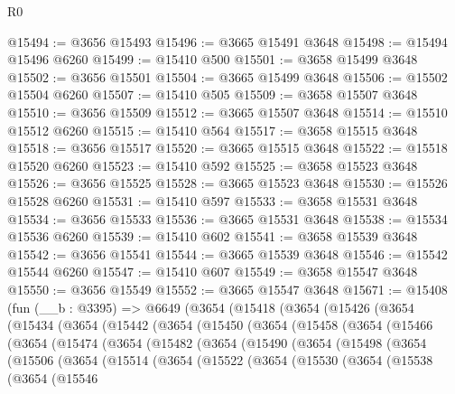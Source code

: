 \begin{lexlean}{R0}
\begin{coremodule}
@15494 := @3656 @15493
@15496 := @3665 @15491 @3648
@15498 := @15494 @15496 @6260
@15499 := @15410 @500
@15501 := @3658 @15499 @3648
@15502 := @3656 @15501
@15504 := @3665 @15499 @3648
@15506 := @15502 @15504 @6260
@15507 := @15410 @505
@15509 := @3658 @15507 @3648
@15510 := @3656 @15509
@15512 := @3665 @15507 @3648
@15514 := @15510 @15512 @6260
@15515 := @15410 @564
@15517 := @3658 @15515 @3648
@15518 := @3656 @15517
@15520 := @3665 @15515 @3648
@15522 := @15518 @15520 @6260
@15523 := @15410 @592
@15525 := @3658 @15523 @3648
@15526 := @3656 @15525
@15528 := @3665 @15523 @3648
@15530 := @15526 @15528 @6260
@15531 := @15410 @597
@15533 := @3658 @15531 @3648
@15534 := @3656 @15533
@15536 := @3665 @15531 @3648
@15538 := @15534 @15536 @6260
@15539 := @15410 @602
@15541 := @3658 @15539 @3648
@15542 := @3656 @15541
@15544 := @3665 @15539 @3648
@15546 := @15542 @15544 @6260
@15547 := @15410 @607
@15549 := @3658 @15547 @3648
@15550 := @3656 @15549
@15552 := @3665 @15547 @3648
@15671 := @15408
    (fun (__b : @3395) =>
    @6649
      (@3654
        (@15418
          (@3654
            (@15426
              (@3654
                (@15434
                  (@3654
                    (@15442
                      (@3654
                        (@15450
                          (@3654
                            (@15458
                              (@3654
                                (@15466
                                  (@3654
                                    (@15474
                                      (@3654
                                        (@15482
                                          (@3654
                                            (@15490
                                              (@3654
                                                (@15498
                                                  (@3654
                                                    (@15506
                                                      (@3654
                                                        (@15514
                                                          (@3654
                                                            (@15522
                                                              (@3654
                                                                (@15530
                                                                  (@3654
                                                                    (@15538
                                                                      (@3654
                                                                        (@15546

\end{coremodule}
\end{lexlean}
